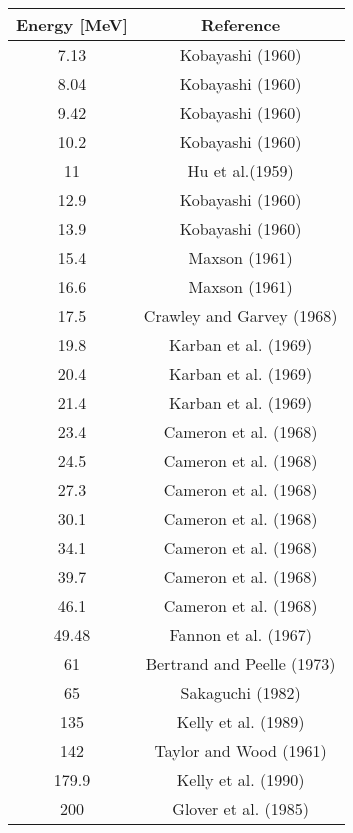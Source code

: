 \begin{tabular}{c  c} 
    \hline 
    \bf{Energy [MeV]} & \bf{Reference} \\
    \hline
    \hline 
    7.13 & Kobayashi (1960) \cite{Kobayashi1960}\\
    8.04 & Kobayashi (1960) \cite{Kobayashi1960}\\
    9.42 & Kobayashi (1960) \cite{Kobayashi1960}\\
    10.2 & Kobayashi (1960) \cite{Kobayashi1960}\\
    11 & Hu et al.(1959) \cite{Hu1959}\\
    12.9 & Kobayashi (1960) \cite{Kobayashi1960}\\
    13.9 & Kobayashi (1960) \cite{Kobayashi1960}\\
    15.4 & Maxson (1961) \cite{Maxson1961}\\
    16.6 & Maxson (1961) \cite{Maxson1961}\\
    17.5 & Crawley and Garvey (1968) \cite{Crawley1968}\\
    19.8 & Karban et al. (1969) \cite{Karban1969}\\
    20.4 & Karban et al. (1969) \cite{Karban1969}\\
    21.4 & Karban et al. (1969) \cite{Karban1969}\\
    23.4 & Cameron et al. (1968) \cite{Cameron1968}\\
    24.5 & Cameron et al. (1968) \cite{Cameron1968}\\
    27.3 & Cameron et al. (1968) \cite{Cameron1968}\\
    30.1 & Cameron et al. (1968) \cite{Cameron1968}\\
    34.1 & Cameron et al. (1968) \cite{Cameron1968}\\
    39.7 & Cameron et al. (1968) \cite{Cameron1968}\\
    46.1 & Cameron et al. (1968) \cite{Cameron1968}\\
    49.48 & Fannon et al. (1967) \cite{Fannon1967}\\
    61 & Bertrand and Peelle (1973) \cite{Bertrand1973}\\
    65 & Sakaguchi (1982) \cite{Sakaguchi1982}\\
    135 & Kelly et al. (1989) \cite{Kelly1989}\\
    142 & Taylor and Wood (1961) \cite{Taylor1961}\\
    179.9 & Kelly et al. (1990) \cite{Kelly1990}\\
    200 & Glover et al. (1985) \cite{Glover1985}\\
    \hline
\end{tabular}

